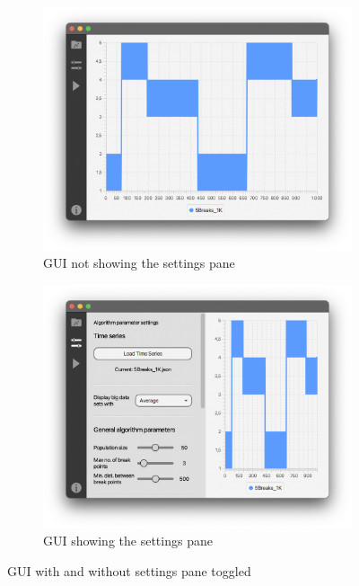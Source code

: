 \begin{figure}[h]
    \centering
    \begin{subfigure}[b]{.48\textwidth}
        \centering
        \includegraphics[width=\textwidth]{fig/gui-toggle-off.png}
        \caption{GUI not showing the settings pane}
        \label{fig:gui-toggle-off}
    \end{subfigure}
    \hfill
    \begin{subfigure}[b]{.48\textwidth}
        \centering
        \includegraphics[width=\textwidth]{fig/gui-toggle-on.png}
        \caption{GUI showing the settings pane}
        \label{fig:gui-toggle-on}
    \end{subfigure}
    \caption{GUI with and without settings pane toggled}
    \label{fig:gui-toggle-ex}
\end{figure}

